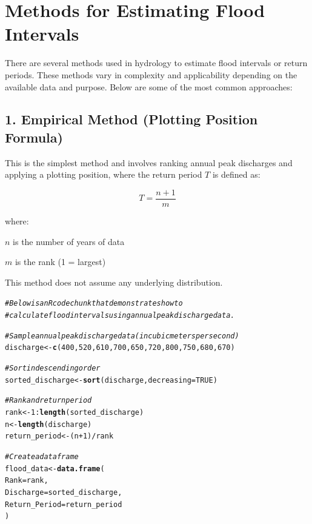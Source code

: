 \documentclass{tufte-handout}\usepackage[]{graphicx}\usepackage[]{xcolor}
\makeatletter
\newcommand{\hlnum}[1]{\textcolor[rgb]{0.686,0.059,0.569}{#1}}%
\newcommand{\hlcom}[1]{\textcolor[rgb]{0.678,0.584,0.686}{\textit{#1}}}%
\newcommand{\hlopt}[1]{\textcolor[rgb]{0,0,0}{#1}}%
\newcommand{\hlstd}[1]{\textcolor[rgb]{0.345,0.345,0.345}{#1}}%
\newcommand{\hlkwb}[1]{\textcolor[rgb]{0.69,0.353,0.396}{#1}}%
\newcommand{\hlkwc}[1]{\textcolor[rgb]{0.333,0.667,0.333}{#1}}%
\newcommand{\hlkwd}[1]{\textcolor[rgb]{0.737,0.353,0.396}{\textbf{#1}}}%
\newenvironment{kframe}{%
 \def\at@end@of@kframe{}%
 \ifinner\ifhmode%
  \def\at@end@of@kframe{\end{minipage}}%
  \begin{minipage}{\columnwidth}%
 \fi\fi%
 \def\FrameCommand##1{\hskip\@totalleftmargin \hskip-\fboxsep
 \colorbox{shadecolor}{##1}\hskip-\fboxsep
     \hskip-\linewidth \hskip-\@totalleftmargin \hskip\columnwidth}%
 \MakeFramed {\advance\hsize-\width
   \@totalleftmargin\z@ \linewidth\hsize
   \@setminipage}}%
 {\par\unskip\endMakeFramed%
 \at@end@of@kframe}
\newenvironment{knitrout}{}{} %
\newenvironment{itemize*}%
  {\begin{itemize}%
    \setlength{\itemsep}{0pt}%
    \setlength{\parskip}{0pt}}%
  {\end{itemize}}
\makeatother
\begin{document}
\section{Methods for Estimating Flood Intervals}

There are several methods used in hydrology to estimate flood intervals or return periods. These methods vary in complexity and applicability depending on the available data and purpose. Below are some of the most common approaches:

\subsection{1. Empirical Method (Plotting Position Formula)}

This is the simplest method and involves ranking annual peak discharges and applying a plotting position, where the return period \( T \) is defined as:

\[
T = \frac{n + 1}{m}
\]


\noindent where:
\begin{itemize*}
  \item \( n \) is the number of years of data
  \item \( m \) is the rank (1 = largest)
\end{itemize*}

This method does not assume any underlying distribution.


\begin{knitrout}
\color{fgcolor}\begin{kframe}
\begin{alltt}
\hlcom{# Below is an R code chunk that demonstrates how to }
\hlcom{# calculate flood intervals using annual peak discharge data.}

\hlcom{# Sample annual peak discharge data (in cubic meters per second)}
\hlstd{discharge} \hlkwb{<-} \hlkwd{c}\hlstd{(}\hlnum{400}\hlstd{,} \hlnum{520}\hlstd{,} \hlnum{610}\hlstd{,} \hlnum{700}\hlstd{,} \hlnum{650}\hlstd{,} \hlnum{720}\hlstd{,} \hlnum{800}\hlstd{,} \hlnum{750}\hlstd{,} \hlnum{680}\hlstd{,} \hlnum{670}\hlstd{)}

\hlcom{# Sort in descending order}
\hlstd{sorted_discharge} \hlkwb{<-} \hlkwd{sort}\hlstd{(discharge,} \hlkwc{decreasing} \hlstd{=} \hlnum{TRUE}\hlstd{)}

\hlcom{# Rank and return period}
\hlstd{rank} \hlkwb{<-} \hlnum{1}\hlopt{:}\hlkwd{length}\hlstd{(sorted_discharge)}
\hlstd{n} \hlkwb{<-} \hlkwd{length}\hlstd{(discharge)}
\hlstd{return_period} \hlkwb{<-} \hlstd{(n} \hlopt{+} \hlnum{1}\hlstd{)} \hlopt{/} \hlstd{rank}

\hlcom{# Create a data frame}
\hlstd{flood_data} \hlkwb{<-} \hlkwd{data.frame}\hlstd{(}
  \hlkwc{Rank} \hlstd{= rank,}
  \hlkwc{Discharge} \hlstd{= sorted_discharge,}
  \hlkwc{Return_Period} \hlstd{= return_period}
\hlstd{)}
\end{alltt}
\end{kframe}
\end{knitrout}
\end{document}
